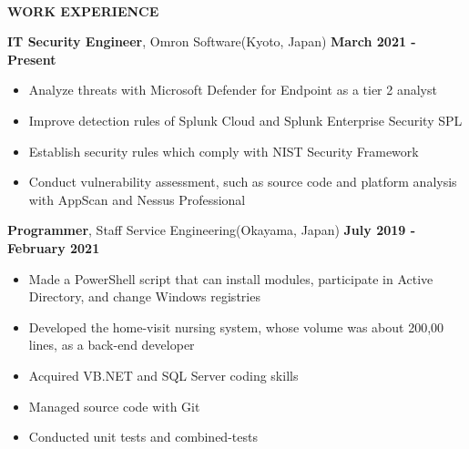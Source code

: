 \begin{center}
    \hrulefill \\
    \begin{large}
        \textbf{WORK EXPERIENCE} \\
    \end{large} 
\end{center}
\textbf{IT Security Engineer}, Omron Software(Kyoto, Japan) \hfill \textbf{March 2021 - Present}
\begin{itemize}
    \item Analyze threats with Microsoft Defender for Endpoint as a tier 2 analyst
    \item Improve detection rules of Splunk Cloud and Splunk Enterprise Security SPL
    \item Establish security rules which comply with NIST Security Framework
    \item Conduct vulnerability assessment, such as source code and platform analysis with AppScan and Nessus Professional
\end{itemize}
\textbf{Programmer}, Staff Service Engineering(Okayama, Japan) \hfill \textbf{July 2019 - February 2021}
\begin{itemize}
    \item Made a PowerShell script that can install modules, participate in Active Directory, and change Windows registries
    \item Developed the home-visit nursing system, whose volume was about 200,00 lines, as a back-end developer
    \item Acquired VB.NET and SQL Server coding skills
    \item Managed source code with Git
    \item Conducted unit tests and combined-tests
\end{itemize}
